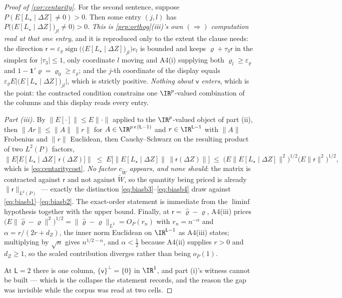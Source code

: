 \begin{proof}[Proof of \cref{cor:centarity}]
For the second sentence, suppose $P(E[L_\star\mid\Delta Z]\ne0)>0$. Then some entry $(j,l)$ has
$P\big(\big(E[L_\star\mid\Delta Z]\big)_{jl}\ne0\big)>0$. \emph{This is \cref{prp:orthog}\textup{(iii)}'s
own $(\Rightarrow)$ computation read at that one entry}, and it is reproduced only to the extent the
clause needs: the direction
$\mathsf r=\varepsilon_\varrho\operatorname{sign}\big(\big(E[L_\star\mid\Delta Z]\big)_{jl}\big)e_l$ is
bounded and keeps $\varrho+\tau_3\mathsf r$ in the simplex for $|\tau_3|\le1$, only coordinate $l$ moving
and A4(i) supplying both $\varrho_l\ge\varepsilon_\varrho$ and
$1-\mathbf 1'\varrho=\varrho_0\ge\varepsilon_\varrho$; and the $j$-th coordinate of the display equals
$\varepsilon_\varrho E\big|\big(E[L_\star\mid\Delta Z]\big)_{jl}\big|$, which is strictly positive.
\emph{Nothing about $\mathsf v$ enters}, which is the point: the contracted condition constrains one
$\IR^{p}$-valued combination of the columns and this display reads every entry.

\emph{Part (iii).} By $\|E[\cdot]\|\le E\|\cdot\|$ applied to the $\IR^{p}$-valued object of part
\textup{(ii)}, then $\|Ar\|\le\|A\|\,\|r\|$ for $A\in\IR^{p\times(\mathsf L-1)}$ and
$r\in\IR^{\mathsf L-1}$ with $\|A\|$ Frobenius and $\|r\|$ Euclidean, then Cauchy--Schwarz on the
resulting product of two $L^{2}(P)$ factors,
\[
\Big\|E\big[E[L_\star\mid\Delta Z]\,\mathsf r(\Delta Z)\big]\Big\|
\;\le\;E\Big[\big\|E[L_\star\mid\Delta Z]\big\|\,\|\mathsf r(\Delta Z)\|\Big]
\;\le\;\Big(E\big\|E[L_\star\mid\Delta Z]\big\|^{2}\Big)^{1/2}\big(E\|\mathsf r\|^{2}\big)^{1/2},
\]
which is \eqref{eq:centaritycost}. \emph{No factor $c_{\widetilde W}$ appears, and none should}: the
matrix is contracted against $\mathsf r$ and not against $\widetilde W$, so the quantity being priced is
already $\|\mathsf r\|_{L^{2}(P)}$ --- exactly the distinction \eqref{eq:biasb3}--\eqref{eq:biasb4} draw
against \eqref{eq:biasb1}--\eqref{eq:biasb2}. The exact-order statement is immediate from the
$\liminf$ hypothesis together with the upper bound. Finally, at $\mathsf r=\hat\varrho-\varrho$, A4(iii)
prices $\big(E\|\hat\varrho-\varrho\|^{2}\big)^{1/2}=\|\hat\varrho-\varrho\|_{L^{2}}=O_P(r_n)$ with
$r_n=n^{-\alpha}$ and $\alpha=r/(2r+d_Z)$, the inner norm Euclidean on $\IR^{\mathsf L-1}$ as A4(iii)
states; multiplying by $\sqrt n$ gives $n^{1/2-\alpha}$, and $\alpha<\tfrac12$ because A4(ii) supplies
$r>0$ and $d_Z\ge1$, so the scaled contribution diverges rather than being $o_P(1)$.

At $\mathsf L=2$ there is one column, $\{\mathsf v\}^{\perp}=\{0\}$ in $\IR^{1}$, and part \textup{(i)}'s
witness cannot be built --- which is the collapse the statement records, and the reason the gap was
invisible while the corpus was read at two cells.
\end{proof}


